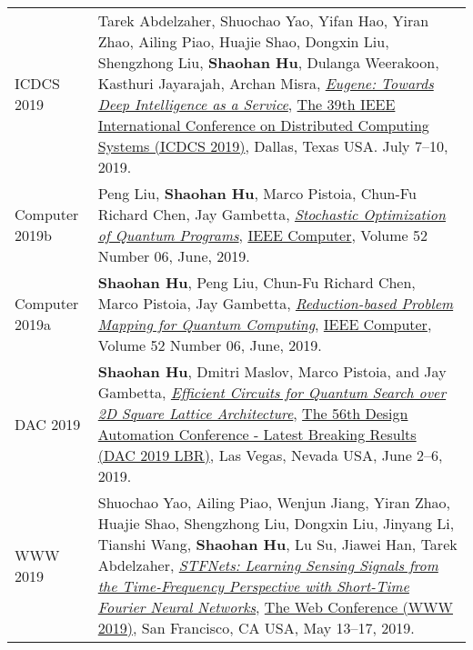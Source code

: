 \begin{longtabu}{p{.51\sectionwidth} p{.78\resumewidth}}
{\sc ICDCS 2019}\hypertarget{abdelzaher2019icdcs}{} &
Tarek Abdelzaher, Shuochao Yao, Yifan Hao, Yiran Zhao, Ailing Piao, Huajie Shao, Dongxin Liu, Shengzhong Liu, \textbf{Shaohan Hu}, Dulanga Weerakoon, Kasthuri Jayarajah, Archan Misra,
\href{https://ieeexplore.ieee.org/document/8884843}{\emph{Eugene: Towards Deep Intelligence as a Service}},
\href{https://theory.utdallas.edu/ICDCS2019/}{\textsf{The 39th IEEE International Conference on Distributed Computing Systems (ICDCS 2019)}},
Dallas, Texas USA. July 7--10, 2019. \\

{\sc Computer 2019b}\hypertarget{liu2019computer}{} &
Peng Liu, \textbf{Shaohan Hu}, Marco Pistoia, Chun-Fu Richard Chen, Jay Gambetta,
\href{https://doi.ieeecomputersociety.org/10.1109/MC.2019.2909711}{\emph{Stochastic Optimization of Quantum Programs}},
\href{https://www.computer.org/csdl/magazines/co}{\textsf{IEEE Computer}},
Volume 52 Number 06, June, 2019. \\

{\sc Computer 2019a}\hypertarget{hu2019computer}{} &
\textbf{Shaohan Hu}, Peng Liu, Chun-Fu Richard Chen, Marco Pistoia, Jay Gambetta,
\href{https://doi.ieeecomputersociety.org/10.1109/MC.2019.2909709}{\emph{Reduction-based Problem Mapping for Quantum Computing}},
\href{https://www.computer.org/csdl/magazines/co}{\textsf{IEEE Computer}},
Volume 52 Number 06, June, 2019. \\

{\sc DAC 2019}\hypertarget{hu2019dac}{} &
\textbf{Shaohan Hu}, Dmitri Maslov, Marco Pistoia, and Jay Gambetta,
\href{https://dl.acm.org/citation.cfm?id=3316781.3322464}{\emph{Efficient Circuits for Quantum Search over 2D Square Lattice Architecture}},
\href{https://dac.com/late-breaking-results}{\textsf{The 56th Design Automation Conference - Latest Breaking Results (DAC 2019 LBR)}},
Las Vegas, Nevada USA, June 2--6, 2019. \\

{\sc WWW 2019}\hypertarget{yao2019www}{} &
Shuochao Yao, Ailing Piao, Wenjun Jiang, Yiran Zhao, Huajie Shao, Shengzhong Liu, Dongxin Liu, Jinyang Li, Tianshi Wang, \textbf{Shaohan Hu}, Lu Su, Jiawei Han, Tarek Abdelzaher,
\href{https://dl.acm.org/citation.cfm?id=3313426}{\emph{STFNets: Learning Sensing Signals from the Time-Frequency Perspective with Short-Time Fourier Neural Networks}},
\href{https://www2019.thewebconf.org/}{\textsf{The Web Conference (WWW 2019)}},
San Francisco, CA USA, May 13--17, 2019. \\


\end{longtabu}

